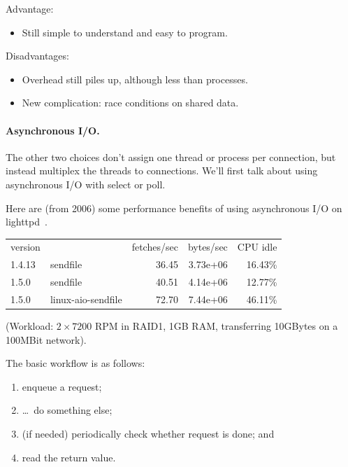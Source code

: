     Advantage:
    \begin{itemize}
      \item Still simple to understand and easy to program.
    \end{itemize}

    Disadvantages:
    \begin{itemize}
      \item Overhead still piles up, although less than processes.
      \item New complication: race conditions on shared data.
    \end{itemize}

\paragraph{Asynchronous I/O.} The other two choices don't assign one thread or process per connection,
but instead multiplex the threads to connections. We'll first talk
about using asynchronous I/O with select or poll.  

Here are (from 2006) some performance benefits of using asynchronous
I/O on lighttpd~\cite{lttpd}.

    \begin{tabular}{llrrr}
    version & & fetches/sec & bytes/sec & CPU idle \\
    1.4.13 & sendfile & 36.45 & 3.73e+06 & 16.43\% \\
    1.5.0 & sendfile & 40.51 & 4.14e+06 & 12.77\% \\
    1.5.0 & linux-aio-sendfile & 72.70 & 7.44e+06 & 46.11\% \\
    \end{tabular}

(Workload: $2\times 7200$ RPM in RAID1, 1GB RAM, transferring 10GBytes on a 100MBit network).

The basic workflow is as follows: 
   \begin{enumerate}
     \item enqueue a request;
     \item \ldots ~do something else;
     \item (if needed) periodically check whether request is done; and
     \item read the return value.
   \end{enumerate}




